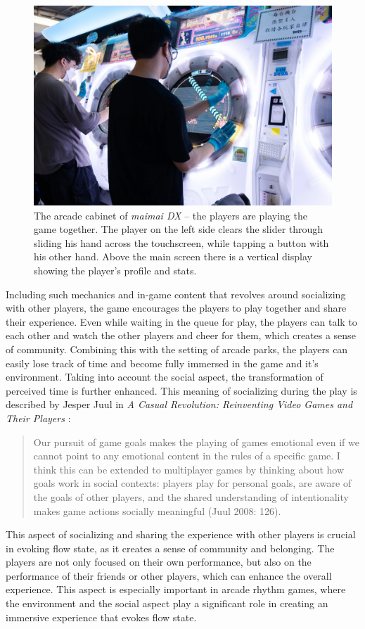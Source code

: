\begin{figure}[h]
    \centering\includegraphics[scale=0.4]{obrazki/maimai2.png}
    \caption{The arcade cabinet of \textit{maimai DX} -- the players are playing the game together. The player on the left side clears the slider through sliding his hand across the touchscreen, while tapping a button with his other hand. Above the main screen there is a vertical display showing the player's profile and stats.\cite{maimai1}}
    \label{fig:maimaicabinet}
\end{figure}

Including such mechanics and in-game content that revolves around socializing with other players, the game encourages the players to play together and share their experience. Even while waiting in the queue for play, the players can talk to each other and watch the other players and cheer for them, which creates a sense of community. Combining this with the setting of arcade parks, the players can easily lose track of time and become fully immersed in the game and it’s environment. Taking into account the social aspect, the transformation of perceived time is further enhanced. This meaning of socializing during the play is described by Jesper Juul in \textit{A Casual Revolution: Reinventing Video Games and Their Players} \cite{casualrevolution}:
\begin{quote}
    Our pursuit of game goals makes the playing of games emotional even if we cannot point to any emotional content in the rules of a specific game. I think this can be
    extended to multiplayer games by thinking about how goals work in social contexts: players play for personal goals, are aware of the goals of other players, and the shared understanding of intentionality makes game actions socially meaningful (Juul 2008: 126).
\end{quote}
This aspect of socializing and sharing the experience with other players is crucial in evoking flow state, as it creates a sense of community and belonging. The players are not only focused on their own performance, but also on the performance of their friends or other players, which can enhance the overall experience. This aspect is especially important in arcade rhythm games, where the environment and the social aspect play a significant role in creating an immersive experience that evokes flow state.

